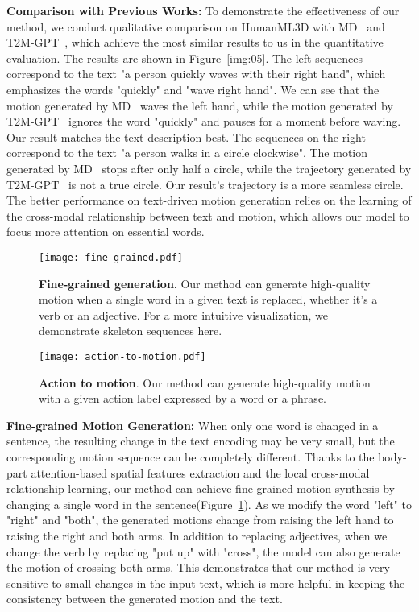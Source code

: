\documentclass[10pt,twocolumn,letterpaper]{article}
\begin{document}
\textbf{Comparison with Previous Works:}
To demonstrate the effectiveness of our method, we conduct qualitative comparison on HumanML3D with MD~\cite{zhang2022motiondiffuse} and T2M-GPT~\cite{zhang2023t2m}, which achieve the most similar results to us in the quantitative evaluation. The results are shown in Figure~\ref{img:05}. The left sequences correspond to the text "a person quickly waves with their right hand", which emphasizes the words "quickly" and "wave right hand". We can see that the motion generated by MD~\cite{zhang2022motiondiffuse} waves the left hand, while the motion generated by T2M-GPT~\cite{zhang2023t2m} ignores the word "quickly" and pauses for a moment before waving. Our result matches the text description best. The sequences on the right correspond to the text "a person walks in a circle clockwise". The motion generated by MD~\cite{zhang2022motiondiffuse} stops after only half a circle, while the trajectory generated by T2M-GPT~\cite{zhang2023t2m} is not a true circle. Our result's trajectory is a more seamless circle. The better performance on text-driven motion generation relies on the learning of the cross-modal relationship between text and motion, which allows our model to focus more attention on essential words.

\begin{figure}[t]
    \centering
    \texttt{[image: fine-grained.pdf]}
    \caption{\textbf{Fine-grained generation}. Our method can generate high-quality motion when a single word in a given text is replaced, whether it's a verb or an adjective. For a more intuitive visualization, we demonstrate skeleton sequences here.}
    \label{img:06}
\end{figure}

\begin{figure}[t]
    \centering
    \texttt{[image: action-to-motion.pdf]}
    \caption{\textbf{Action to motion}. Our method can generate high-quality motion with a given action label expressed by a word or a phrase.}
    \label{img:08}
\end{figure}

\textbf{Fine-grained Motion Generation:}
When only one word is changed in a sentence, the resulting change in the text encoding may be very small, but the corresponding motion sequence can be completely different. Thanks to the body-part attention-based spatial features extraction and the local cross-modal relationship learning, our method can achieve fine-grained motion synthesis by changing a single word in the sentence(Figure~\ref{img:06}). As we modify the word "left" to "right" and "both", the generated motions change from raising the left hand to raising the right and both arms. In addition to replacing adjectives, when we change the verb by replacing "put up" with "cross", the model can also generate the motion of crossing both arms. This demonstrates that our method is very sensitive to small changes in the input text, which is more helpful in keeping the consistency between the generated motion and the text. 
\end{document}
